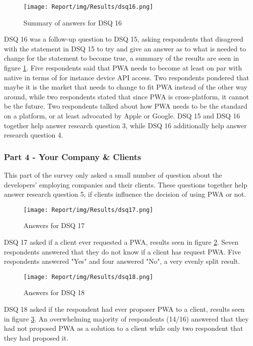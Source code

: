 \documentclass[a4paper,12pt]{article}
\begin{document}
\begin{figure}[ht!]
    \centering
    \texttt{[image: Report/img/Results/dsq16.png]}
    \caption{Summary of answers for DSQ 16}
    \label{fig:res_devq16}
\end{figure}

\newpage
DSQ 16 was a follow-up question to DSQ 15, asking respondents that disagreed with the statement in DSQ 15 to try and give an answer as to what is needed to change for the statement to become true, a summary of the results are seen in figure \ref{fig:res_devq16}. Five respondents said that PWA needs to become at least on par with native in terms of for instance device API access. Two respondents pondered that maybe it is the market that needs to change to fit PWA instead of the other way around, while two respondents stated that since PWA is cross-platform, it cannot be the future. Two respondents talked about how PWA needs to be the standard on a platform, or at least advocated by Apple or Google. DSQ 15 and DSQ 16 together help answer research question 3, while DSQ 16 additionally help answer research question 4.

\subsubsection{Part 4 - Your Company \& Clients}
This part of the survey only asked a small number of question about the developers' employing companies and their clients. These questions together help answer research question 5, if clients influence the decision of using PWA or not. 

\begin{figure}[ht!]
    \centering
    \texttt{[image: Report/img/Results/dsq17.png]}
    \caption{Answers for DSQ 17}
    \label{fig:res_devq17}
\end{figure}

DSQ 17 asked if a client ever requested a PWA, results seen in figure \ref{fig:res_devq17}. Seven respondents answered that they do not know if a client has request PWA. Five respondents answered "Yes" and four answered "No", a very evenly split result.

\begin{figure}[ht!]
    \centering
    \texttt{[image: Report/img/Results/dsq18.png]}
    \caption{Answers for DSQ 18}
    \label{fig:res_devq18}
\end{figure}

DSQ 18 asked if the respondent had ever proposer PWA to a client, results seen in figure \ref{fig:res_devq18}. An overwhelming majority of respondents (14/16) answered that they had not proposed PWA as a solution to a client while only two respondent that they had proposed it.
\end{document}
